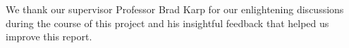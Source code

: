 \documentclass[../main.tex]{subfiles}
\begin{document}
We thank our supervisor Professor Brad Karp for our enlightening discussions
during the course of this project and his insightful feedback that helped us
improve this report.
\end{document}
